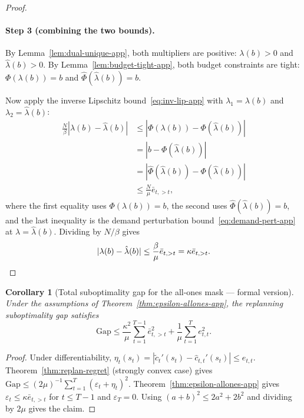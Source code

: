 \documentclass{uai2026} %
\newtheorem{corollary}[theorem]{Corollary}
\newcommand{\1}{\mathbf{1}}
\renewcommand{\epsilon}{\varepsilon}
\begin{document}
\begin{proof}
  \paragraph{Step 3 (combining the two bounds).}
  By Lemma~\ref{lem:dual-unique-app}, both multipliers are positive:
  $\lambda(b) > 0$ and $\hat{\lambda}(b) > 0$.
  By Lemma~\ref{lem:budget-tight-app}, both budget constraints are tight:
  $\Phi(\lambda(b)) = b$ and $\hat{\Phi}(\hat{\lambda}(b)) = b$.

  Now apply the inverse Lipschitz bound~\eqref{eq:inv-lip-app}
  with $\lambda_1 = \lambda(b)$ and $\lambda_2 = \hat{\lambda}(b)$:
  \begin{align*}
    \frac{N}{\beta}|\lambda(b)-\hat{\lambda}(b)|
    &\le |\Phi(\lambda(b))-\Phi(\hat{\lambda}(b))| \\
    &= |b - \Phi(\hat{\lambda}(b))| \\
    &= |\hat{\Phi}(\hat{\lambda}(b)) - \Phi(\hat{\lambda}(b))| \\
    &\le \frac{N}{\mu}\bar{e}_{t,>t},
  \end{align*}
  where the first equality uses $\Phi(\lambda(b))=b$,
  the second uses $\hat{\Phi}(\hat{\lambda}(b))=b$,
  and the last inequality is the demand perturbation
  bound~\eqref{eq:demand-pert-app} at $\lambda = \hat{\lambda}(b)$.
  Dividing by $N/\beta$ gives
  \begin{equation*}
    |\lambda(b)-\hat{\lambda}(b)|
    \le \frac{\beta}{\mu}\bar{e}_{t,>t}
    = \kappa\bar{e}_{t,>t}.
    \qedhere
  \end{equation*}
\end{proof}

\begin{corollary}[Total suboptimality gap for the all-ones mask --- formal version]
  \label{cor:regret-allones-app}%
  Under the assumptions of Theorem~\ref{thm:epsilon-allones-app},
  the replanning suboptimality gap satisfies
  \begin{equation*}
    \mathrm{Gap}
    \le \frac{\kappa^{2}}{\mu}\sum_{t=1}^{T-1} \bar{e}_{t,>t}^{2}
    + \frac{1}{\mu}\sum_{t=1}^{T} e_{t,t}^{2}.
  \end{equation*}
\end{corollary}

\begin{proof}
  Under differentiability, $\eta_t(s_t)=|\tilde{c}_t'(s_t)-\hat{c}_{t,t}'(s_t)|\le e_{t,t}$.
  Theorem~\ref{thm:replan-regret} (strongly convex case) gives
  $\mathrm{Gap}\le (2\mu)^{-1}\sum_{t=1}^{T}(\epsilon_t+\eta_t)^2$.
  Theorem~\ref{thm:epsilon-allones-app} gives $\epsilon_t \le \kappa \bar{e}_{t,>t}$ for $t \le T-1$ and $\epsilon_T=0$.
  Using $(a+b)^2\le 2a^2+2b^2$ and dividing by $2\mu$ gives the claim.
\end{proof}
\end{document}
